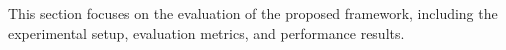 This section focuses on the evaluation of the proposed framework, including the experimental setup, evaluation metrics, and performance results.
